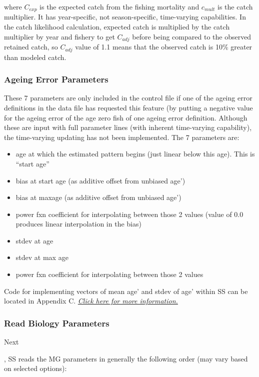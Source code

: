\noindent where $C_{exp}$ is the expected catch from the fishing mortality and $c_{mult}$ is the catch multiplier. It has year-specific, not season-specific, time-varying capabilities.  In the catch likelihood calculation, expected catch is multiplied by the catch multiplier by year and fishery to get $C_{adj}$ before being compared to the observed retained catch, so $C_{adj}$ value of 1.1 means that the observed catch is 10\% greater than modeled catch.

\subsubsection{Ageing Error Parameters}
These 7 parameters are only included in the control file if one of the ageing error definitions in the data file has requested this feature (by putting a negative value for the ageing error of the age zero fish of one ageing error definition.  Although these are input with full parameter lines (with inherent time-varying capability), the time-varying updating has not been implemented. The 7 parameters are:
\begin{itemize}
	\item age at which the estimated pattern begins (just linear below this age).  This is “start age”
	\item bias at start age (as additive offset from unbiased age’)
	\item bias at maxage (as additive offset from unbiased age’)
	\item power fxn coefficient for interpolating between those 2 values (value of 0.0 produces linear interpolation in the bias)
	\item stdev at age
	\item stdev at max age
	\item power fxn coefficient for interpolating between those 2 values
\end{itemize}

\noindent Code for implementing vectors of mean age' and stdev of age' within SS can be located in Appendix C. \hyperlink{AgeingError}{\textit{Click here for more information.}}


\pagebreak
\subsubsection{Read Biology Parameters}
\hypertarget{MGorder}{Next}, SS reads the MG parameters in generally the following order (may vary based on selected options):

